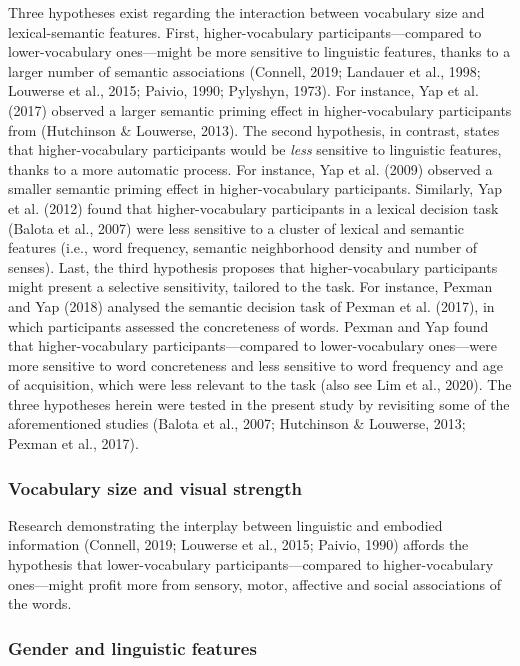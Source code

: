 \documentclass[
  12pt,
  man,floatsintext]{apa7}
\begin{document}
Three hypotheses exist regarding the interaction between vocabulary size and lexical-semantic features. First, higher-vocabulary participants---compared to lower-vocabulary ones---might be more sensitive to linguistic features, thanks to a larger number of semantic associations (Connell, 2019; Landauer et al., 1998; Louwerse et al., 2015; Paivio, 1990; Pylyshyn, 1973). For instance, Yap et al. (2017) observed a larger semantic priming effect in higher-vocabulary participants from (Hutchinson \& Louwerse, 2013). The second hypothesis, in contrast, states that higher-vocabulary participants would be \emph{less} sensitive to linguistic features, thanks to a more automatic process. For instance, Yap et al. (2009) observed a smaller semantic priming effect in higher-vocabulary participants. Similarly, Yap et al. (2012) found that higher-vocabulary participants in a lexical decision task (Balota et al., 2007) were less sensitive to a cluster of lexical and semantic features (i.e., word frequency, semantic neighborhood density and number of senses). Last, the third hypothesis proposes that higher-vocabulary participants might present a selective sensitivity, tailored to the task. For instance, Pexman and Yap (2018) analysed the semantic decision task of Pexman et al. (2017), in which participants assessed the concreteness of words. Pexman and Yap found that higher-vocabulary participants---compared to lower-vocabulary ones---were more sensitive to word concreteness and less sensitive to word frequency and age of acquisition, which were less relevant to the task (also see Lim et al., 2020). The three hypotheses herein were tested in the present study by revisiting some of the aforementioned studies (Balota et al., 2007; Hutchinson \& Louwerse, 2013; Pexman et al., 2017).

\hypertarget{vocabulary-size-and-visual-strength}{%
\subsubsection{Vocabulary size and visual strength}\label{vocabulary-size-and-visual-strength}}

Research demonstrating the interplay between linguistic and embodied information (Connell, 2019; Louwerse et al., 2015; Paivio, 1990) affords the hypothesis that lower-vocabulary participants---compared to higher-vocabulary ones---might profit more from sensory, motor, affective and social associations of the words.

\hypertarget{gender-and-linguistic-features}{%
\subsubsection{Gender and linguistic features}\label{gender-and-linguistic-features}}
\end{document}
